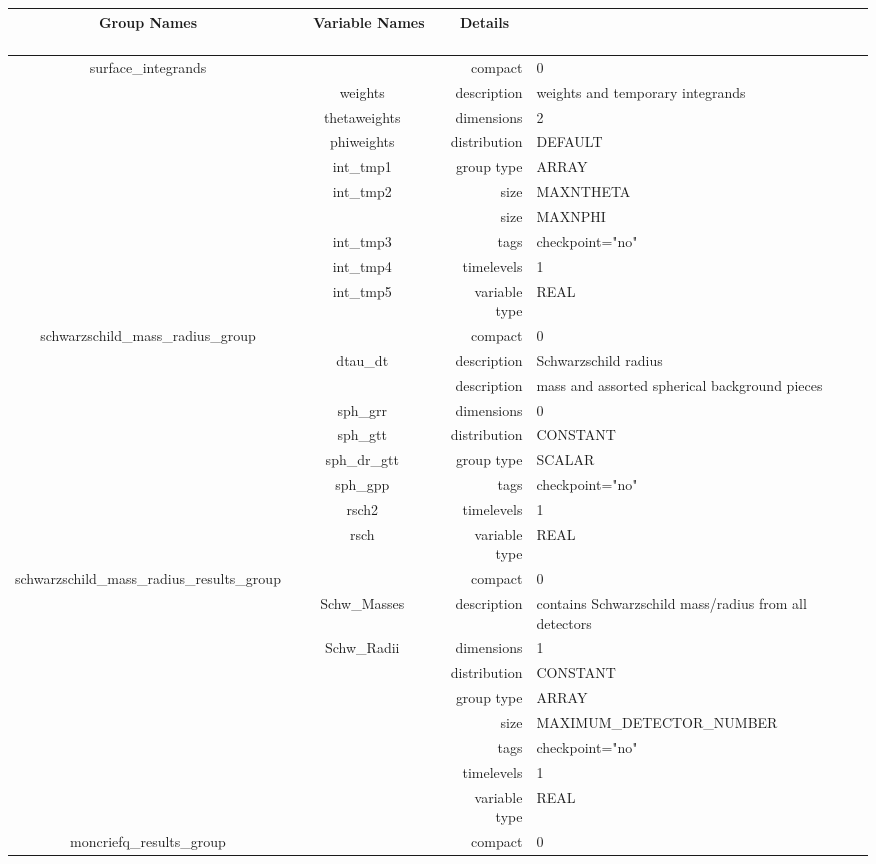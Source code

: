 \begin{tabular*}{150mm}{|c|c@{\extracolsep{\fill}}|rl|} \hline 
~ {\bf Group Names} ~ & ~ {\bf Variable Names} ~  &{\bf Details} ~ & ~ \\ 
\hline 
surface\_integrands &  & compact & 0 \\ 
 & weights & description & weights and temporary integrands \\ 
 & thetaweights & dimensions & 2 \\ 
 & phiweights & distribution & DEFAULT \\ 
 & int\_tmp1 & group type & ARRAY \\ 
 & int\_tmp2 & size & MAXNTHETA \\ 
& ~ & size & MAXNPHI \\ 
 & int\_tmp3 & tags & checkpoint="no" \\ 
 & int\_tmp4 & timelevels & 1 \\ 
 & int\_tmp5 & variable type & REAL \\ 
\hline 
schwarzschild\_mass\_radius\_group &  & compact & 0 \\ 
 & dtau\_dt & description & Schwarzschild radius \\ 
& ~ & description &  mass and assorted spherical background pieces \\ 
 & sph\_grr & dimensions & 0 \\ 
 & sph\_gtt & distribution & CONSTANT \\ 
 & sph\_dr\_gtt & group type & SCALAR \\ 
 & sph\_gpp & tags & checkpoint="no" \\ 
 & rsch2 & timelevels & 1 \\ 
 & rsch & variable type & REAL \\ 
\hline 
schwarzschild\_mass\_radius\_results\_group &  & compact & 0 \\ 
 & Schw\_Masses & description & contains Schwarzschild mass/radius from all detectors \\ 
 & Schw\_Radii & dimensions & 1 \\ 
 &  & distribution & CONSTANT \\ 
 &  & group type & ARRAY \\ 
 &  & size & MAXIMUM\_DETECTOR\_NUMBER \\ 
 &  & tags & checkpoint="no" \\ 
 &  & timelevels & 1 \\ 
 &  & variable type & REAL \\ 
\hline 
moncriefq\_results\_group &  & compact & 0 \\ 

\end{tabular*}
